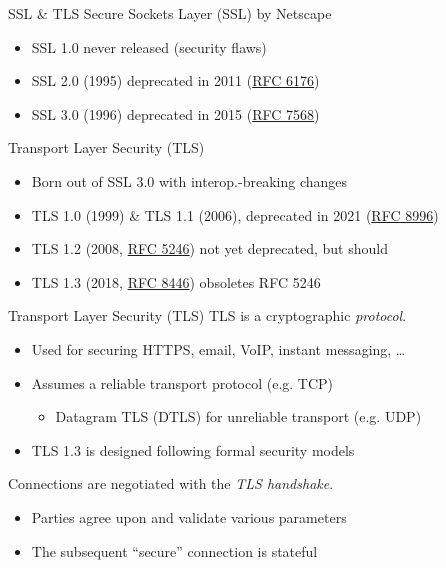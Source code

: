 \begin{frame}{SSL \& TLS}
  Secure Sockets Layer (SSL) by Netscape
  \begin{itemize}[<+(1)->]
    \item SSL 1.0 never released (security flaws)
    \item SSL 2.0 (1995) deprecated in 2011 (\href{https://datatracker.ietf.org/doc/html/rfc6176}{RFC 6176})
    \item SSL 3.0 (1996) deprecated in 2015 (\href{https://datatracker.ietf.org/doc/html/rfc7568}{RFC 7568}) 
  \end{itemize}

  \vspace*{1em}

  \pause
  Transport Layer Security (TLS)
  \begin{itemize}[<+(1)->]
    \item Born out of SSL 3.0 with interop.-breaking changes
    \item TLS 1.0 (1999) \& TLS 1.1 (2006), deprecated in 2021 (\href{https://datatracker.ietf.org/doc/html/rfc8996}{RFC 8996})
    \item TLS 1.2 (2008, \href{https://datatracker.ietf.org/doc/html/rfc5246}{RFC 5246}) not yet deprecated, but should
    \item TLS 1.3 (2018, \href{https://datatracker.ietf.org/doc/html/rfc8446}{RFC 8446}) obsoletes RFC 5246
  \end{itemize}
\end{frame}

\begin{frame}{Transport Layer Security (TLS)}
  TLS is a cryptographic \emph{protocol}.
  \begin{itemize}[<+(1)->]
    \item Used for securing HTTPS, email, VoIP, instant messaging, \dots
    \item Assumes a reliable transport protocol (e.g. TCP)
    \par
    \begin{itemize}
      \item Datagram TLS (DTLS) for unreliable transport (e.g. UDP)
    \end{itemize}
    \item TLS 1.3 is designed following formal security models
  \end{itemize}

  \vspace*{1em}

  \pause
  Connections are negotiated with the \emph{TLS handshake}.
  \begin{itemize}[<+(1)->]
    \item Parties agree upon and validate various parameters
    \item The subsequent \enquote{secure} connection is stateful
  \end{itemize}
\end{frame}

